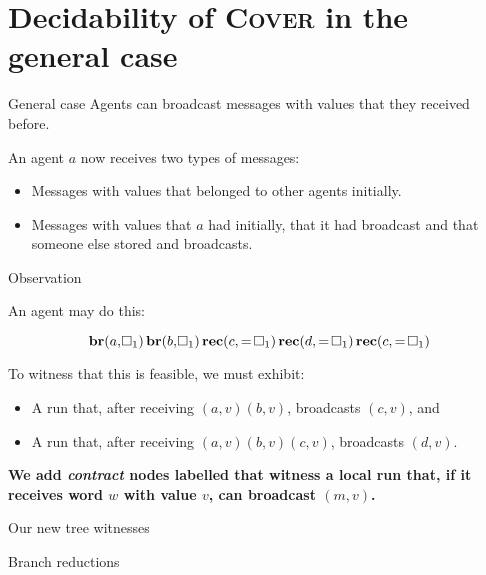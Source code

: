 \documentclass{beamer}
\newcommand{\br}{\mathbf{br}}
\newcommand{\rec}{\mathbf{rec}}
\newcommand{\reg}{\hspace{-0.5mm}\square}
\newcommand{\COVER}{\textsc{Cover}\xspace}
\begin{document}
\section{Decidability of \COVER in the general case}


\begin{frame}{General case}
	Agents can broadcast messages with values that they received before.
	\vspace{0.5cm}
	
	An agent $a$ now receives two types of messages:
	\begin{itemize}
		\item Messages with values that belonged to other agents initially.
		
		\item Messages with values that $a$ had initially, that it had broadcast and that someone else stored and broadcasts.  
	\end{itemize}
\end{frame}

\begin{frame}{Observation}
	
	An agent may do this:
	
	\[ \br(a, \reg_1) \, \br(b, \reg_1) \, \rec(c, =\reg_1)  \,\rec(d, =\reg_1) \, \rec(c, =\reg_1)\]
	\pause
	
	To witness that this is feasible, we must exhibit: 
	\begin{itemize}
		\item A run that, after receiving $(a, v) (b, v)$, broadcasts $(c,v)$, and
		
		\item A run that, after receiving $(a,v) (b,v) (c,v)$, broadcasts $(d,v)$.
	\end{itemize}
\vspace{0.5cm}

	\pause
	\textbf{We add \emph{contract} nodes labelled  that witness a local run that, if it receives word $w$ with value $v$, can broadcast $(m,v)$.}
\end{frame}

\begin{frame}{Our new tree witnesses}
	
	
	
\end{frame}


\begin{frame}{Branch reductions}
	\begin{columns}
		\begin{column}{0.5\textwidth}
			
		\end{column}
		
		\begin{column}{0.5\textwidth}
			
		\end{column}
	\end{columns}
	
\end{frame}
\end{document}
